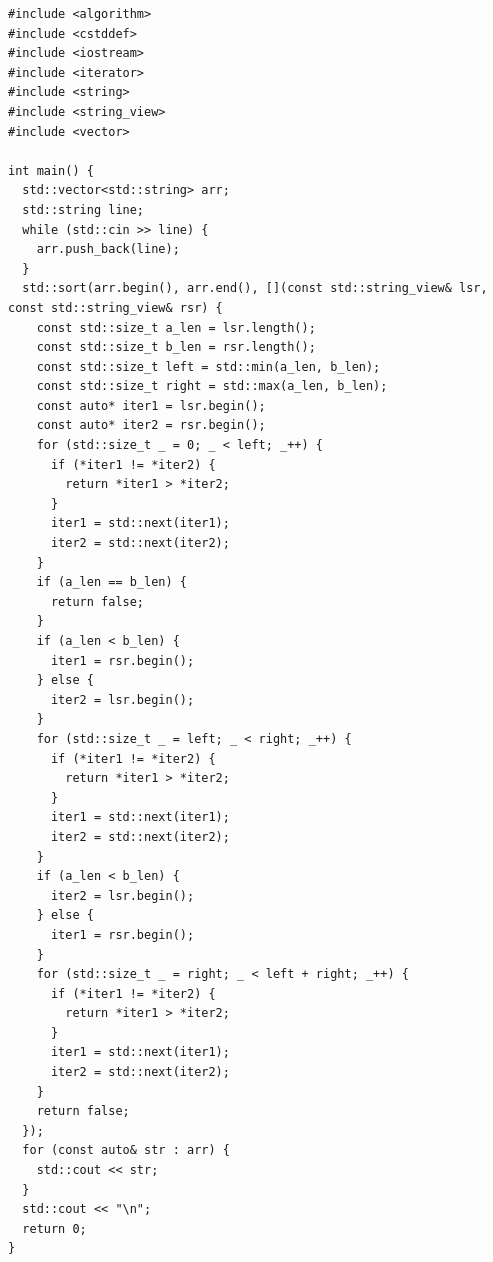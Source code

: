 \begin{lstlisting}
#include <algorithm>
#include <cstddef>
#include <iostream>
#include <iterator>
#include <string>
#include <string_view>
#include <vector>

int main() {
  std::vector<std::string> arr;
  std::string line;
  while (std::cin >> line) {
    arr.push_back(line);
  }
  std::sort(arr.begin(), arr.end(), [](const std::string_view& lsr, const std::string_view& rsr) {
    const std::size_t a_len = lsr.length();
    const std::size_t b_len = rsr.length();
    const std::size_t left = std::min(a_len, b_len);
    const std::size_t right = std::max(a_len, b_len);
    const auto* iter1 = lsr.begin();
    const auto* iter2 = rsr.begin();
    for (std::size_t _ = 0; _ < left; _++) {
      if (*iter1 != *iter2) {
        return *iter1 > *iter2;
      }
      iter1 = std::next(iter1);
      iter2 = std::next(iter2);
    }
    if (a_len == b_len) {
      return false;
    }
    if (a_len < b_len) {
      iter1 = rsr.begin();
    } else {
      iter2 = lsr.begin();
    }
    for (std::size_t _ = left; _ < right; _++) {
      if (*iter1 != *iter2) {
        return *iter1 > *iter2;
      }
      iter1 = std::next(iter1);
      iter2 = std::next(iter2);
    }
    if (a_len < b_len) {
      iter2 = lsr.begin();
    } else {
      iter1 = rsr.begin();
    }
    for (std::size_t _ = right; _ < left + right; _++) {
      if (*iter1 != *iter2) {
        return *iter1 > *iter2;
      }
      iter1 = std::next(iter1);
      iter2 = std::next(iter2);
    }
    return false;
  });
  for (const auto& str : arr) {
    std::cout << str;
  }
  std::cout << "\n";
  return 0;
}
\end{lstlisting}